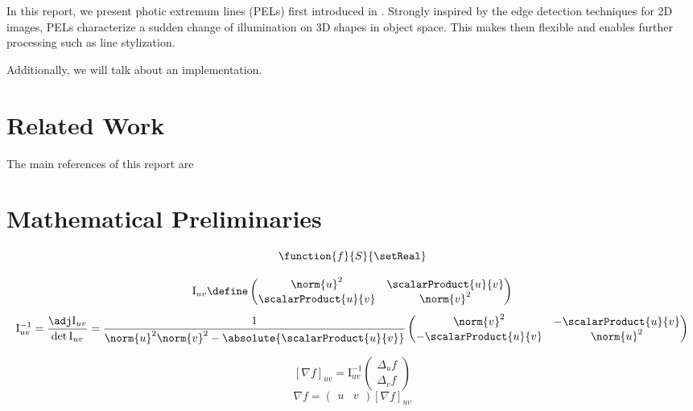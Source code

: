 \documentclass[9pt,fleqn,twoside,twocolumn]{stdglobal}
\begin{document}
  In this report, we present photic extremum lines (PELs) first introduced in \textcite{xie2007}.
  Strongly inspired by the edge detection techniques for 2D images, PELs characterize a sudden change of illumination on 3D shapes in object space.
  This makes them flexible and enables further processing such as line stylization.

  Additionally, we will talk about an implementation.

\section{Related Work}
  The main references of this report are

\section{Mathematical Preliminaries}
  \begin{definition}
    \[
      \function{f}{S}{\setReal}
    \]
  \end{definition}

  \begin{definition}
    \[
      \mathrm{I}_{uv} \define
      \begin{pmatrix}
        \norm{u}^2 & \scalarProduct{u}{v} \\
        \scalarProduct{u}{v} & \norm{v}^2
      \end{pmatrix}
    \]
    \[
      \mathrm{I}^{-1}_{uv} = \frac{\adj \mathrm{I}_{uv}}{\det \mathrm{I}_{uv}} =
      \frac{1}{\norm{u}^2\norm{v}^2 - \absolute{\scalarProduct{u}{v}}}
      \begin{pmatrix}
        \norm{v}^2 & -\scalarProduct{u}{v} \\
        -\scalarProduct{u}{v} & \norm{u}^2
      \end{pmatrix}
    \]
  \end{definition}

  \begin{definition}
    \[
      [\nabla f]_{uv} = \mathrm{I}^{-1}_{uv}
      \begin{pmatrix}
        \Delta_u f \\
        \Delta_v f
      \end{pmatrix}
    \]
    \[
      \nabla f =
      \begin{pmatrix}
        u & v
      \end{pmatrix}
      [\nabla f]_{uv}
    \]
  \end{definition}
\end{document}
